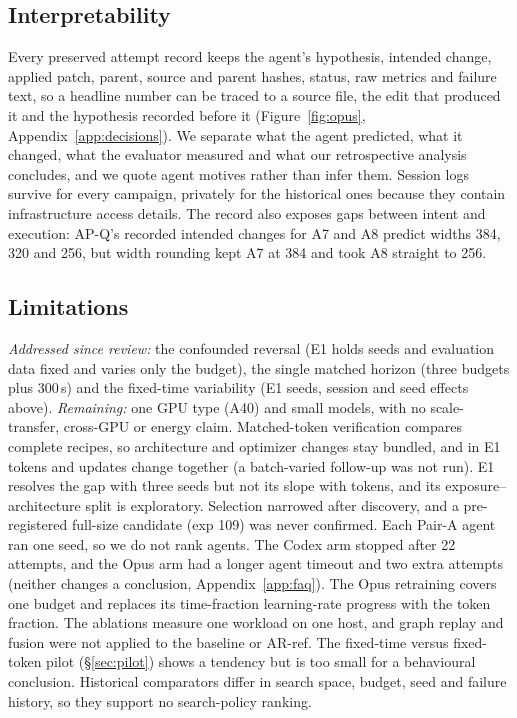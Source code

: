 \documentclass{article}
\newif\ifshowhumanmarkers \showhumanmarkersfalse
\newcommand{\humantag}[1]{{\color{humanframe}\sffamily\scriptsize\bfseries HUMAN AUTHOR MUST REWRITE/VERIFY [#1]}\ }
\newcommand{\humanauthor}[2][]{\ifshowhumanmarkers\begin{humanbox}\humantag{#1}#2\end{humanbox}\else #2\par\fi}
\begin{document}
\subsection{Interpretability}
\humanauthor[P2-13]{Every preserved attempt record keeps the agent's hypothesis, intended change, applied patch, parent, source and parent hashes, status, raw metrics and failure text, so a headline number can be traced to a source file, the edit that produced it and the hypothesis recorded before it (Figure~\ref{fig:opus}, Appendix~\ref{app:decisions}). We separate what the agent predicted, what it changed, what the evaluator measured and what our retrospective analysis concludes, and we quote agent motives rather than infer them. Session logs survive for every campaign, privately for the historical ones because they contain infrastructure access details. The record also exposes gaps between intent and execution: AP-Q's recorded intended changes for A7 and A8 predict widths 384, 320 and 256, but width rounding kept A7 at 384 and took A8 straight to 256.}

\subsection{Limitations}
\humanauthor[P2-14]{\emph{Addressed since review:} the confounded reversal (E1 holds seeds and evaluation data fixed and varies only the budget), the single matched horizon (three budgets plus 300\,s) and the fixed-time variability (E1 seeds, session and seed effects above). \emph{Remaining:} one GPU type (A40) and small models, with no scale-transfer, cross-GPU or energy claim. Matched-token verification compares complete recipes, so architecture and optimizer changes stay bundled, and in E1 tokens and updates change together (a batch-varied follow-up was not run). E1 resolves the gap with three seeds but not its slope with tokens, and its exposure--architecture split is exploratory. Selection narrowed after discovery, and a pre-registered full-size candidate (exp 109) was never confirmed. Each Pair-A agent ran one seed, so we do not rank agents. The Codex arm stopped after 22 attempts, and the Opus arm had a longer agent timeout and two extra attempts (neither changes a conclusion, Appendix~\ref{app:faq}). The Opus retraining covers one budget and replaces its time-fraction learning-rate progress with the token fraction. The ablations measure one workload on one host, and graph replay and fusion were not applied to the baseline or AR-ref. The fixed-time versus fixed-token pilot (\S\ref{sec:pilot}) shows a tendency but is too small for a behavioural conclusion. Historical comparators differ in search space, budget, seed and failure history, so they support no search-policy ranking.}
\end{document}
